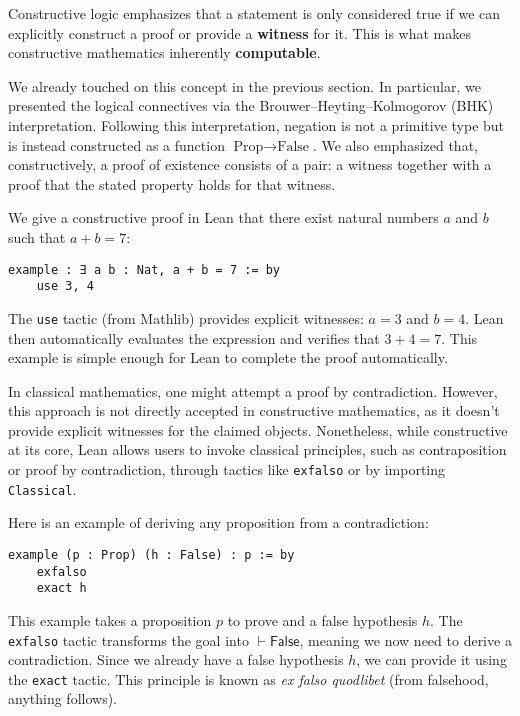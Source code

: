 Constructive logic emphasizes that a statement is only
considered true if we can explicitly construct
a proof or provide a \textbf{witness} for it.
This is what makes constructive mathematics inherently \textbf{computable}.

We already touched on this concept in the previous section.
In particular, we presented the logical connectives via the
Brouwer--Heyting--Kolmogorov (BHK) interpretation.
Following this interpretation, negation is not a primitive type
but is instead constructed as a function $\text{Prop} \to \text{False}$.
We also emphasized that, constructively,
a proof of existence consists of a pair:
a witness together with a proof that the stated property holds for that witness.

\begin{example}
  We give a constructive proof in Lean that there exist natural numbers
  $a$ and $b$ such that $a + b = 7$:
  \begin{lstlisting}[language=lean]
  example : ∃ a b : Nat, a + b = 7 := by
    use 3, 4
  \end{lstlisting}
  The \lstinline[language=lean]|use| tactic (from Mathlib) provides
  explicit witnesses: $a = 3$ and $b = 4$.
  Lean then automatically evaluates the expression and verifies that
  $3 + 4 = 7$.
  This example is simple enough for Lean to complete the proof automatically.
\end{example}

In classical mathematics, one might attempt a proof by contradiction.
However, this approach is not directly accepted in constructive mathematics,
as it doesn't provide explicit witnesses for the claimed objects.
Nonetheless, while constructive at its core, Lean allows users to
invoke classical principles, such as contraposition or proof by contradiction,
through tactics like \lstinline[language=lean]|exfalso| or by importing
\lstinline[language=lean]|Classical|.

\begin{example}
  Here is an example of deriving any proposition from a contradiction:
  \begin{lstlisting}[language=lean]
  example (p : Prop) (h : False) : p := by
    exfalso
    exact h
  \end{lstlisting}
  This example takes a proposition $p$ to prove and a false hypothesis $h$.
  The \lstinline[language=lean]|exfalso| tactic transforms the goal into
  $\vdash \mathsf{False}$, meaning we now need to derive a contradiction.
  Since we already have a false hypothesis $h$,
  we can provide it using the \lstinline[language=lean]|exact| tactic.
  This principle is known as \textit{ex falso quodlibet}
  (from falsehood, anything follows).
\end{example}

